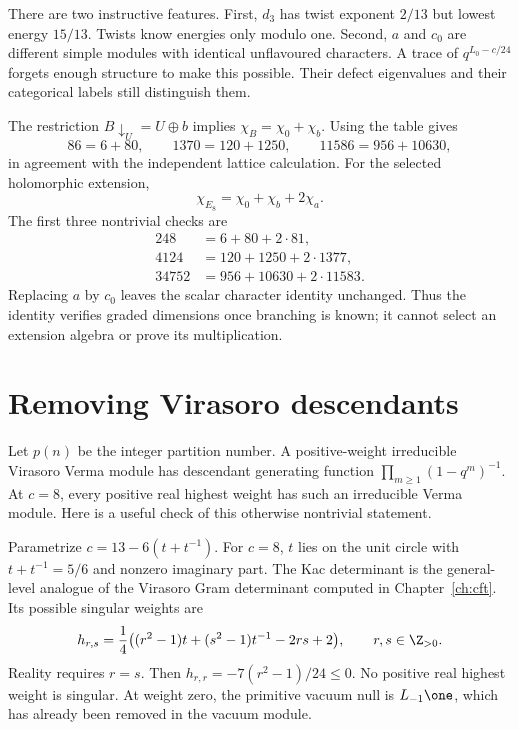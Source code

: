 There are two instructive features. First, $d_3$ has twist exponent
$2/13$ but lowest energy $15/13$. Twists know energies only modulo
one. Second, $a$ and $c_0$ are different simple modules with identical
unflavoured characters. A trace of $q^{L_0-c/24}$ forgets enough
structure to make this possible. Their defect eigenvalues and their
categorical labels still distinguish them.

\begin{example}
The restriction $B\downarrow_U=U\oplus b$ implies
$\chi_B=\chi_0+\chi_b$. Using the table gives
\[
 86=6+80,\qquad1370=120+1250,\qquad
 11586=956+10630,
\]
in agreement with the independent lattice calculation.
For the selected holomorphic extension,
\begin{equation}
 \chi_{E_8}=\chi_0+\chi_b+2\chi_a.
 \label{eq:char-branch-E8}
\end{equation}
The first three nontrivial checks are
\[
 \begin{split}
 248&=6+80+2\cdot81,\\
 4124&=120+1250+2\cdot1377,\\
 34752&=956+10630+2\cdot11583.
 \end{split}
\]
Replacing $a$ by $c_0$ leaves the scalar character identity unchanged.
Thus the identity verifies graded dimensions once branching is known;
it cannot select an extension algebra or prove its multiplication.
\end{example}

\section{Removing Virasoro descendants}

Let $p(n)$ be the integer partition number. A positive-weight
irreducible Virasoro Verma module has descendant generating function
$\prod_{m\ge1}(1-q^m)^{-1}$. At $c=8$, every positive real highest
weight has such an irreducible Verma module. Here is a useful check
of this otherwise nontrivial statement.

Parametrize $c=13-6(t+t^{-1})$. For $c=8$, $t$ lies on the unit
circle with $t+t^{-1}=5/6$ and nonzero imaginary part. The Kac
determinant is the general-level analogue of the Virasoro Gram
determinant computed in Chapter~\ref{ch:cft}. Its possible singular
weights are
\[
 h_{r,s}=\frac14\bigl((r^2-1)t+(s^2-1)t^{-1}-2rs+2\bigr),
 \qquad r,s\in\Z_{>0}.
\]
Reality requires $r=s$. Then
$h_{r,r}=-7(r^2-1)/24\le0$. No positive real highest weight is
singular. At weight zero, the primitive vacuum null is
$L_{-1}\one$, which has already been removed in the vacuum module.

